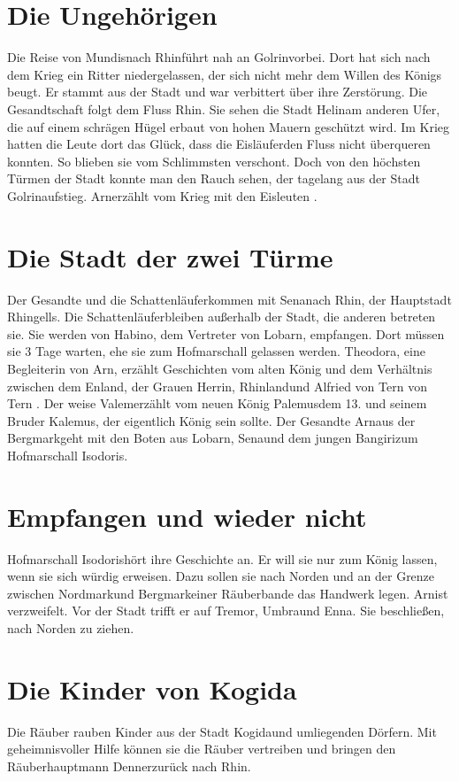 \documentclass[12pt,a4paper,onecolumn,twoside,ngerman]{book}
\newcommand{\Tern}{Tern }
\newcommand{\Sena}{Sena}
\newcommand{\Bangiri}{Bangiri}
\newcommand{\Arwed}{Alfried von \Tern}
\newcommand{\Enland}{Enland}
\newcommand{\Schattenlaufer}{Schattenläufer}
\newcommand{\Umbra}{Umbra}
\newcommand{\Enna}{Enna}
\newcommand{\Tremor}{Tremor}
\newcommand{\Lobarn}{Lobarn}
\newcommand{\Nordmark}{Nordmark}
\newcommand{\Bergmark}{Bergmark}
\newcommand{\Arn}{Arn}
\newcommand{\Eislaufer}{Eisläufer}
\newcommand{\Theodora}{Theodora}
\newcommand{\Rhinland}{Rhinland}
\newcommand{\Rhingell}{Rhingell}
\newcommand{\Mundis}{Mundis}
\newcommand{\Helin}{Helin}
\newcommand{\Golrin}{Golrin}
\newcommand{\Rhin}{Rhin}
\newcommand{\Habino}{Habino}
\newcommand{\Valem}{Valem}
\newcommand{\Palemus}{Palemus}
\newcommand{\Kalemus}{Kalemus}
\newcommand{\Isodoris}{Isodoris}
\newcommand{\Kogida}{Kogida}
\newcommand{\Denner}{Denner}
\begin{document}
\section{Die Ungehörigen}

Die Reise von \Mundis nach \Rhin führt nah an \Golrin vorbei. Dort hat sich nach dem Krieg ein Ritter niedergelassen, der sich nicht mehr dem Willen des Königs beugt. Er stammt aus der Stadt und war verbittert über ihre Zerstörung. Die Gesandtschaft folgt dem Fluss \Rhin . Sie sehen die Stadt \Helin am anderen Ufer, die auf einem schrägen Hügel erbaut von hohen Mauern geschützt wird. Im Krieg hatten die Leute dort das Glück, dass die \Eislaufer den Fluss nicht überqueren konnten. So blieben sie vom Schlimmsten verschont. Doch von den höchsten Türmen der Stadt konnte man den Rauch sehen, der tagelang aus der Stadt \Golrin aufstieg. \Arn erzählt vom Krieg mit den Eisleuten . 

\section{Die Stadt der zwei Türme}

Der Gesandte und die \Schattenlaufer kommen mit \Sena nach \Rhin, der Hauptstadt \Rhingell{s}. Die \Schattenlaufer bleiben außerhalb der Stadt, die anderen betreten sie. Sie werden von \Habino , dem Vertreter von \Lobarn , empfangen. Dort müssen sie 3 Tage warten, ehe sie zum Hofmarschall gelassen werden. \Theodora , eine Begleiterin von \Arn , erzählt Geschichten vom alten König und dem Verhältnis zwischen dem \Enland , der Grauen Herrin, \Rhinland und \Arwed von \Tern. Der weise \Valem erzählt vom neuen König \Palemus dem 13. und seinem Bruder \Kalemus , der eigentlich König sein sollte. Der Gesandte \Arn aus der \Bergmark geht mit den Boten aus \Lobarn , \Sena und dem jungen \Bangiri zum Hofmarschall \Isodoris.

\section{Empfangen und wieder nicht}
Hofmarschall \Isodoris hört ihre Geschichte an. Er will sie nur zum König lassen, wenn sie sich würdig erweisen. Dazu sollen sie nach Norden und an der Grenze zwischen \Nordmark und \Bergmark einer Räuberbande das Handwerk legen. \Arn ist verzweifelt. Vor der Stadt trifft er auf \Tremor , \Umbra und \Enna . Sie beschließen, nach Norden zu ziehen.

\section{Die Kinder von Kogida}
Die Räuber rauben Kinder aus der Stadt \Kogida und umliegenden Dörfern. Mit geheimnisvoller Hilfe können sie die Räuber vertreiben und bringen den Räuberhauptmann \Denner zurück nach \Rhin.
\end{document}
